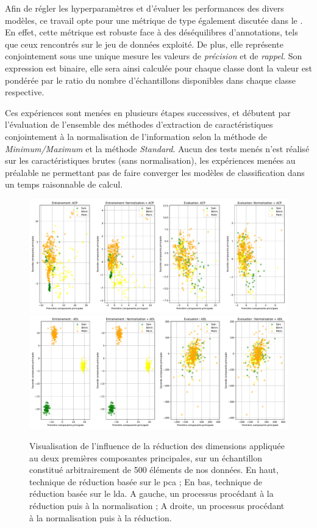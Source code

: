 Afin de régler les hyperparamètres et d'évaluer les performances des divers modèles, ce travail opte pour une métrique de type \fscore{} également discutée dans le . En effet, cette métrique est robuste face à des déséquilibres d'annotations, tels que ceux rencontrés sur le jeu de données exploité. De plus, elle représente conjointement sous une unique mesure les valeurs de \textit{précision} et de \textit{rappel}. Son expression est binaire, elle sera ainsi calculée pour chaque classe dont la valeur est pondérée par le ratio du nombre d'échantillons disponibles dans chaque classe respective.\par

Ces expériences sont menées en plusieurs étapes successives, et débutent par l'évaluation de l'ensemble des méthodes d'extraction de caractéristiques conjointement à la normalisation de l'information selon la méthode de \textit{Minimum/Maximum} et la méthode \textit{Standard}. Aucun des tests menés n'est réalisé sur les caractéristiques brutes (sans normalisation), les expériences menées au préalable ne permettant pas de faire converger les modèles de classification dans un temps raisonnable de calcul.\par
 
\begin{figure}[H]
    \centering
    \includegraphics[width=\linewidth]{contents/chapter_5/resources/visualisation_scaling_PCA.pdf}
    \includegraphics[width=\linewidth]{contents/chapter_5/resources/visualisation_scaling_LDA.pdf}
    \caption{Visualisation de l'influence de la réduction des dimensions appliquée au deux premières composantes principales, sur un échantillon constitué arbitrairement de 500 éléments de nos données. En haut, technique de réduction basée sur le \gls{pca} ; En bas, technique de réduction basée sur le \gls{lda}. A gauche, un processus procédant à la réduction puis à la normalisation ; A droite, un processus procédant à la normalisation puis à la réduction.}
    \label{fig:visualisation_scaling_reduction}
\end{figure}\par

